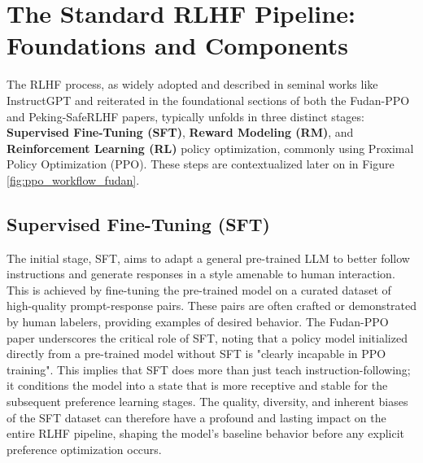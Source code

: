 \documentclass{article}
\begin{document}
\section{The Standard RLHF Pipeline: Foundations and Components}
\label{sec:standard_rlhf}

The RLHF process, as widely adopted and described in seminal works like InstructGPT \cite{Ouyang2022InstructGPT} and reiterated in the foundational sections of both the Fudan-PPO \cite{Zheng2023PPO} and Peking-SafeRLHF \cite{Dai2023SafeRLHF} papers, typically unfolds in three distinct stages: \textbf{Supervised Fine-Tuning (SFT)}, \textbf{Reward Modeling (RM)}, and \textbf{Reinforcement Learning (RL)} policy optimization, commonly using Proximal Policy Optimization (PPO). These steps are contextualized later on in Figure \ref{fig:ppo_workflow_fudan}.

\subsection{Supervised Fine-Tuning (SFT)}
The initial stage, SFT, aims to adapt a general pre-trained LLM to better follow instructions and generate responses in a style amenable to human interaction. This is achieved by fine-tuning the pre-trained model on a curated dataset of high-quality prompt-response pairs.  These pairs are often crafted or demonstrated by human labelers, providing examples of desired behavior. \cite{Ouyang2022InstructGPT} The Fudan-PPO paper underscores the critical role of SFT, noting that a policy model initialized directly from a pre-trained model without SFT is "clearly incapable in PPO training". \cite{Zheng2023PPO} This implies that SFT does more than just teach instruction-following; it conditions the model into a state that is more receptive and stable for the subsequent preference learning stages. The quality, diversity, and inherent biases of the SFT dataset can therefore have a profound and lasting impact on the entire RLHF pipeline, shaping the model's baseline behavior before any explicit preference optimization occurs.
\end{document}
